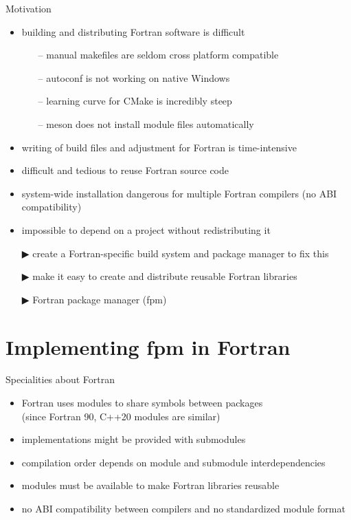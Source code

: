 \documentclass[lualatex,10pt,aspectratio=169]{beamer}
\begin{document}
\begin{frame}{Motivation}
   \begin{itemize}
      \item building and distributing Fortran software is difficult
         \begin{itemize}
            \item[--] manual makefiles are seldom cross platform compatible
            \item[--] autoconf is not working on native Windows
            \item[--] learning curve for CMake is incredibly steep
            \item[--] meson does not install module files automatically
         \end{itemize}
      \item writing of build files and adjustment for Fortran is time-intensive
      \item difficult and tedious to reuse Fortran source code
      \item system-wide installation dangerous for multiple Fortran compilers
         (no ABI compatibility)
      \item impossible to depend on a project without redistributing it
         \\[2ex]
      \item[\alert{▶}] create a \alert{Fortran-specific} build system and package manager to fix this
      \item[\alert{▶}] make it easy to create and distribute \alert{reusable} Fortran libraries
      \item[\alert{▶}] Fortran package manager (\alert{fpm})
   \end{itemize}
\end{frame}


\section{Implementing fpm in Fortran}

\begin{frame}{Specialities about Fortran}
   \begin{itemize}
      \item Fortran uses modules to share symbols between packages\\(since Fortran 90, C++20 modules are similar)
      \item implementations might be provided with submodules
      \item compilation order depends on module and submodule interdependencies
      \item modules must be available to make Fortran libraries reusable
      \item no ABI compatibility between compilers and no standardized module format
   \end{itemize}
\end{frame}
\end{document}
